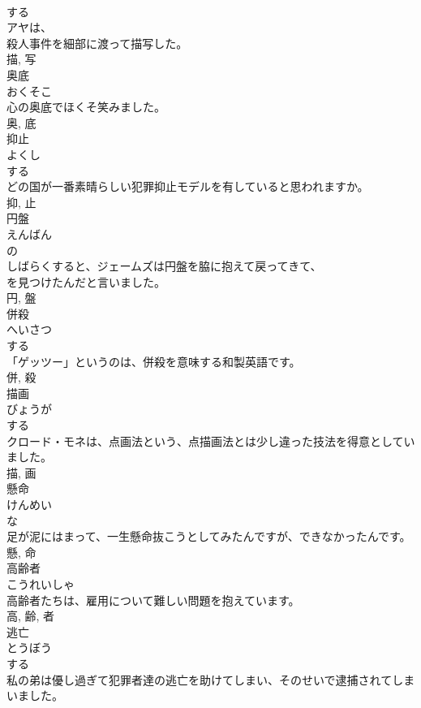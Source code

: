 \documentclass[8pt]{extreport}
\begin{document}
\begin{CJK}{UTF8}{min}
\\	する 
\\	アヤは、
\\	殺人事件を細部に渡って描写した。	
\\	描, 写	
\\	奥底	
\\	おくそこ	
\\	心の奥底でほくそ笑みました。	
\\	奥, 底	
\\	抑止	
\\	よくし	
\\	する 
\\	どの国が一番素晴らしい犯罪抑止モデルを有していると思われますか。	
\\	抑, 止	
\\	円盤	
\\	えんばん	
\\	の 
\\	しばらくすると、ジェームズは円盤を脇に抱えて戻ってきて、
\\	を見つけたんだと言いました。	
\\	円, 盤	
\\	併殺	
\\	へいさつ	
\\	する 
\\	「ゲッツー」というのは、併殺を意味する和製英語です。	
\\	併, 殺	
\\	描画	
\\	びょうが	
\\	する 
\\	クロード・モネは、点画法という、点描画法とは少し違った技法を得意としていました。	
\\	描, 画	
\\	懸命	
\\	けんめい	
\\	な 
\\	足が泥にはまって、一生懸命抜こうとしてみたんですが、できなかったんです。	
\\	懸, 命	
\\	高齢者	
\\	こうれいしゃ	
\\	高齢者たちは、雇用について難しい問題を抱えています。	
\\	高, 齢, 者	
\\	逃亡	
\\	とうぼう	
\\	する 
\\	私の弟は優し過ぎて犯罪者達の逃亡を助けてしまい、そのせいで逮捕されてしまいました。	

\end{CJK}
\end{document}
